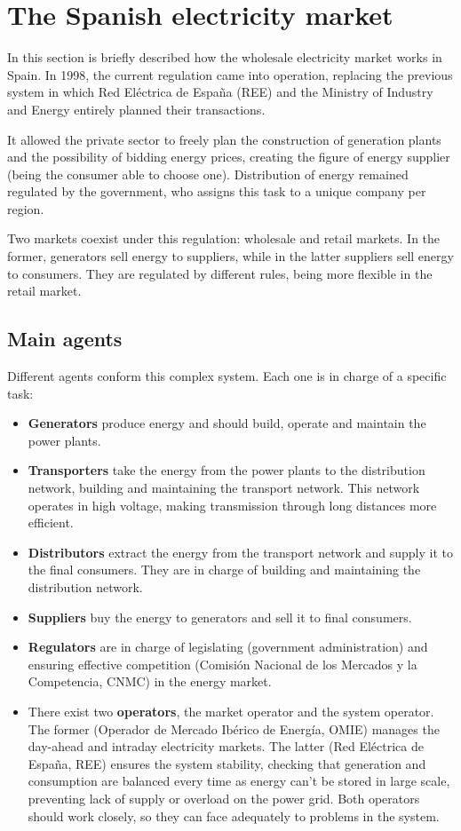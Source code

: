 \chapter{The Spanish electricity market}
\label{ch:electricity-market}
In this section is briefly described how the wholesale electricity market works in Spain.
In 1998, the current regulation came into operation, replacing the previous system in which Red Eléctrica de España (REE) and the Ministry of Industry and Energy entirely planned their transactions.

It allowed the private sector to freely plan the construction of generation plants and the possibility of bidding energy prices, creating the figure of energy supplier (being the consumer able to choose one).
Distribution of energy remained regulated by the government, who assigns this task to a unique company per region. \cite{mercado-electrico-mincotur}

Two markets coexist under this regulation: wholesale and retail markets. In the former, generators sell energy to suppliers, while in the latter suppliers sell energy to consumers. They are regulated by different rules, being more flexible in the retail market.

\section{Main agents}
Different agents conform this complex system. Each one is in charge of a specific task:\cite{mercado-electrico-endesa, organismos-reguladores-holaluz}

\begin{itemize}
    \item \textbf{Generators} produce energy and should build, operate and maintain the power plants.
    \item \textbf{Transporters} take the energy from the power plants to the distribution network, building and maintaining the transport network. This network operates in high voltage, making transmission through long distances more efficient.
    \item \textbf{Distributors} extract the energy from the transport network and supply it to the final consumers. They are in charge of building and maintaining the distribution network.
    \item \textbf{Suppliers} buy the energy to generators and sell it to final consumers.
    \item \textbf{Regulators} are in charge of legislating (government administration) and ensuring effective competition (Comisión Nacional de los Mercados y la Competencia, CNMC) in the energy market.
    \item There exist two \textbf{operators}, the market operator and the system operator. The former (Operador de Mercado Ibérico de Energía, OMIE) manages the day-ahead and intraday electricity markets. The latter (Red Eléctrica de España, REE) ensures the system stability, checking that generation and consumption are balanced every time as energy can't be stored in large scale, preventing lack of supply or overload on the power grid. Both operators should work closely, so they can face adequately to problems in the system.
\end{itemize}


